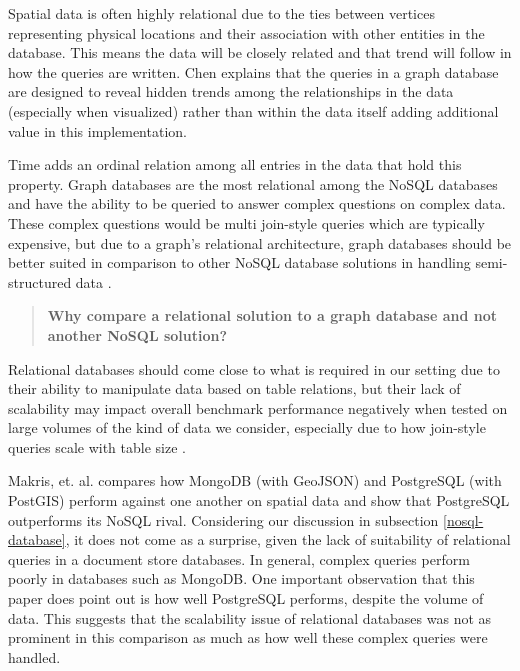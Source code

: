 Spatial data is often highly relational due to the ties between vertices representing physical locations and their association with other entities in the database. This means the data will be closely related and that trend will follow in how the queries are written. Chen \cite{socialdata} explains that the queries in a graph database are designed to reveal hidden trends among the relationships in the data (especially when visualized) rather than within the data itself adding additional value in this implementation.

Time adds an ordinal relation among all entries in the data that hold this property. Graph databases are the most relational among the NoSQL databases and have the ability to be queried to answer complex questions on complex data. These complex questions would be multi join-style queries which are typically expensive, but due to a graph's relational architecture, graph databases should be better suited in comparison to other NoSQL database solutions in handling semi-structured data \cite{data-in-nosql}.

\begin{quote}
    \textbf{Why compare a relational solution to a graph database and not another NoSQL solution?}
\end{quote}

Relational databases should come close to what is required in our setting due to their ability to manipulate data based on table relations, but their lack of scalability may impact overall benchmark performance negatively when tested on large volumes of the kind of data we consider, especially due to how join-style queries scale with table size \cite{data-in-nosql}.

Makris, et. al. \cite{mongovspostgres} compares how MongoDB (with GeoJSON) and PostgreSQL (with PostGIS) perform against one another on spatial data and show that PostgreSQL outperforms its NoSQL rival. Considering our discussion in subsection \ref{nosql-database}, it does not come as a surprise, given the lack of suitability of relational queries in a document store databases. In general, complex queries perform poorly in databases such as MongoDB. One important observation that this paper does point out is how well PostgreSQL performs, despite the volume of data. This suggests that the scalability issue of relational databases was not as prominent in this comparison as much as how well these complex queries were handled.

